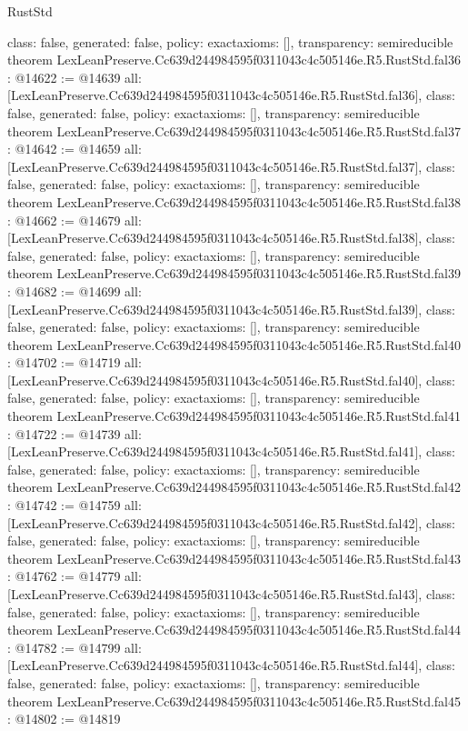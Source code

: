 \begin{lexlean}{RustStd}
\begin{coremodule}
{  class: false,
  generated: false,
  policy: exact{axioms: []},
  transparency: semireducible
}
theorem LexLeanPreserve.Cc639d244984595f0311043c4c505146e.R5.RustStd.fal36 : @14622 := @14639 {
  all: [LexLeanPreserve.Cc639d244984595f0311043c4c505146e.R5.RustStd.fal36],
  class: false,
  generated: false,
  policy: exact{axioms: []},
  transparency: semireducible
}
theorem LexLeanPreserve.Cc639d244984595f0311043c4c505146e.R5.RustStd.fal37 : @14642 := @14659 {
  all: [LexLeanPreserve.Cc639d244984595f0311043c4c505146e.R5.RustStd.fal37],
  class: false,
  generated: false,
  policy: exact{axioms: []},
  transparency: semireducible
}
theorem LexLeanPreserve.Cc639d244984595f0311043c4c505146e.R5.RustStd.fal38 : @14662 := @14679 {
  all: [LexLeanPreserve.Cc639d244984595f0311043c4c505146e.R5.RustStd.fal38],
  class: false,
  generated: false,
  policy: exact{axioms: []},
  transparency: semireducible
}
theorem LexLeanPreserve.Cc639d244984595f0311043c4c505146e.R5.RustStd.fal39 : @14682 := @14699 {
  all: [LexLeanPreserve.Cc639d244984595f0311043c4c505146e.R5.RustStd.fal39],
  class: false,
  generated: false,
  policy: exact{axioms: []},
  transparency: semireducible
}
theorem LexLeanPreserve.Cc639d244984595f0311043c4c505146e.R5.RustStd.fal40 : @14702 := @14719 {
  all: [LexLeanPreserve.Cc639d244984595f0311043c4c505146e.R5.RustStd.fal40],
  class: false,
  generated: false,
  policy: exact{axioms: []},
  transparency: semireducible
}
theorem LexLeanPreserve.Cc639d244984595f0311043c4c505146e.R5.RustStd.fal41 : @14722 := @14739 {
  all: [LexLeanPreserve.Cc639d244984595f0311043c4c505146e.R5.RustStd.fal41],
  class: false,
  generated: false,
  policy: exact{axioms: []},
  transparency: semireducible
}
theorem LexLeanPreserve.Cc639d244984595f0311043c4c505146e.R5.RustStd.fal42 : @14742 := @14759 {
  all: [LexLeanPreserve.Cc639d244984595f0311043c4c505146e.R5.RustStd.fal42],
  class: false,
  generated: false,
  policy: exact{axioms: []},
  transparency: semireducible
}
theorem LexLeanPreserve.Cc639d244984595f0311043c4c505146e.R5.RustStd.fal43 : @14762 := @14779 {
  all: [LexLeanPreserve.Cc639d244984595f0311043c4c505146e.R5.RustStd.fal43],
  class: false,
  generated: false,
  policy: exact{axioms: []},
  transparency: semireducible
}
theorem LexLeanPreserve.Cc639d244984595f0311043c4c505146e.R5.RustStd.fal44 : @14782 := @14799 {
  all: [LexLeanPreserve.Cc639d244984595f0311043c4c505146e.R5.RustStd.fal44],
  class: false,
  generated: false,
  policy: exact{axioms: []},
  transparency: semireducible
}
theorem LexLeanPreserve.Cc639d244984595f0311043c4c505146e.R5.RustStd.fal45 : @14802 := @14819 {
}
\end{coremodule}
\end{lexlean}
